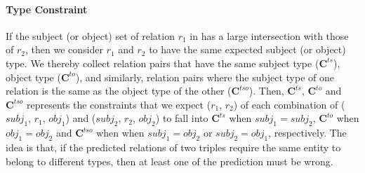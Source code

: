 \paragraph{Type Constraint}
If the subject (or object) set of relation $r_1$ in \KB has a large intersection with those of $r_2$, then we consider $r_1$ and $r_2$ to have the same expected subject (or object) type.
We thereby collect relation pairs that have the same subject type ($\bm{C}^{ts}$), object type ($\bm{C}^{to}$), 
and similarly, relation pairs where the subject type of one relation is the same as the object type of the other ($\bm{C}^{tso}$).
Then, $\bm{C}^{ts}$, $\bm{C}^{to}$ and $\bm{C}^{tso}$ represents the constraints that we expect ($r_1$, $r_2$) of each combination of ($subj_1$, $r_1$, $obj_1$) and ($subj_2$, $r_2$, $obj_2$) to fall into $\bm{C}^{ts}$ when $subj_1=subj_2$, $\bm{C}^{to}$ when $obj_1=obj_2$ and $\bm{C}^{tso}$ when when $subj_1=obj_2$ or $subj_2=obj_1$, respectively.
The idea is that, if the predicted relations of two triples require the same entity to belong to different types, then at least one of the prediction must be wrong.

